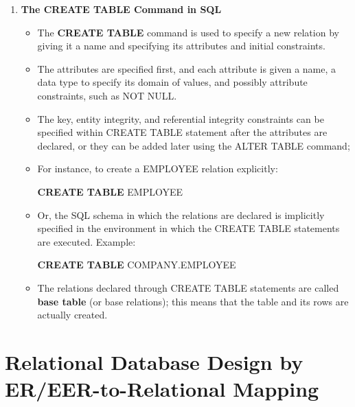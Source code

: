 \documentclass[10pt]{article}
\newcommand{\tf}{\textbf}
\begin{document}
\begin{enumerate}
	\item \tf{The CREATE TABLE Command in SQL}
	\begin{itemize}
		\item The \tf{CREATE TABLE} command is used to specify a new relation by giving it a name and specifying its attributes and initial constraints.
		\item The attributes are specified first, and each attribute is given a name, a data type to specify its domain of values, and possibly attribute constraints, such as NOT NULL.
		\item The key, entity integrity, and referential integrity constraints can be specified within CREATE TABLE statement after the attributes are declared, or they can be added later using the ALTER TABLE command;
		\item For instance, to create a EMPLOYEE relation explicitly:
		\begin{center}
			\tf{CREATE TABLE} EMPLOYEE
		\end{center}
		\item Or, the SQL schema in which the relations are declared is implicitly specified in the environment in which the CREATE TABLE statements are executed. Example:
		\begin{center}
			\tf{CREATE TABLE} COMPANY.EMPLOYEE
		\end{center}
		\item The relations declared through CREATE TABLE statements are called \tf{base table} (or base relations); this means that the table and its rows are actually created.
	\end{itemize}
\end{enumerate}

\pagebreak
\section{Relational Database Design by ER/EER-to-Relational Mapping}
\end{document}
